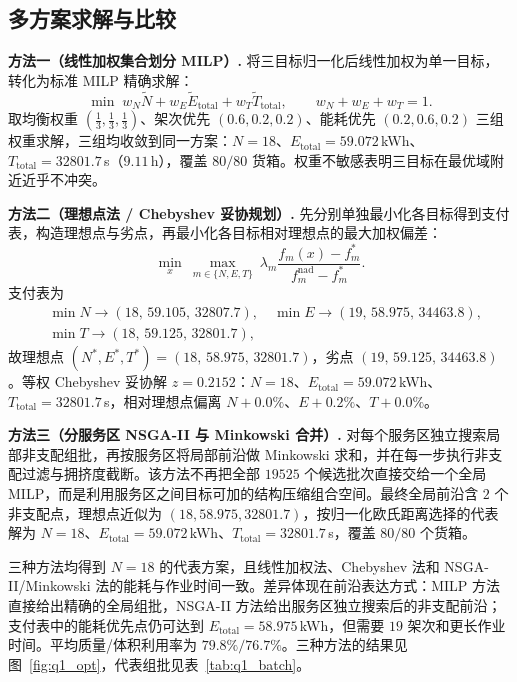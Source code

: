 \subsection{多方案求解与比较}

\textbf{方法一（线性加权集合划分 MILP）.} 将三目标归一化后线性加权为单一目标，转化为标准 MILP 精确求解：
\begin{equation}
\min\; w_N\tilde N+w_E\tilde E_{\text{total}}+w_T\tilde T_{\text{total}},\qquad w_N+w_E+w_T=1.
\end{equation}
取均衡权重 $(\tfrac13,\tfrac13,\tfrac13)$、架次优先 $(0.6,0.2,0.2)$、能耗优先 $(0.2,0.6,0.2)$ 三组权重求解，三组均收敛到同一方案：$N=18$、$E_{\text{total}}=59.072\,$kWh、$T_{\text{total}}=32801.7\,$s（$9.11\,$h），覆盖 $80/80$ 货箱。权重不敏感表明三目标在最优域附近近乎不冲突。

\textbf{方法二（理想点法 / Chebyshev 妥协规划）.} 先分别单独最小化各目标得到支付表，构造理想点与劣点，再最小化各目标相对理想点的最大加权偏差：
\begin{equation}
\min_{x}\ \max_{m\in\{N,E,T\}}\ \lambda_m\frac{f_m(x)-f_m^{*}}{f_m^{\text{nad}}-f_m^{*}} .
\end{equation}
支付表为
\begin{equation*}
\begin{aligned}
&\min N\to(18,\,59.105,\,32807.7),\quad
\min E\to(19,\,58.975,\,34463.8),\\
&\min T\to(18,\,59.125,\,32801.7),
\end{aligned}
\end{equation*}
故理想点 $(N^*,E^*,T^*)=(18,\,58.975,\,32801.7)$，劣点 $(19,\,59.125,\,34463.8)$。等权 Chebyshev 妥协解 $z=0.2152$：$N=18$、$E_{\text{total}}=59.072\,$kWh、$T_{\text{total}}=32801.7\,$s，相对理想点偏离 $N{+}0.0\%$、$E{+}0.2\%$、$T{+}0.0\%$。

\textbf{方法三（分服务区 NSGA-II 与 Minkowski 合并）.} 对每个服务区独立搜索局部非支配组批，再按服务区将局部前沿做 Minkowski 求和，并在每一步执行非支配过滤与拥挤度截断。该方法不再把全部 $19525$ 个候选批次直接交给一个全局 MILP，而是利用服务区之间目标可加的结构压缩组合空间。最终全局前沿含 $2$ 个非支配点，理想点近似为 $(18,58.975,32801.7)$，按归一化欧氏距离选择的代表解为 $N=18$、$E_{\text{total}}=59.072\,$kWh、$T_{\text{total}}=32801.7\,$s，覆盖 $80/80$ 个货箱。

三种方法均得到 $N=18$ 的代表方案，且线性加权法、Chebyshev 法和 NSGA-II/Minkowski 法的能耗与作业时间一致。差异体现在前沿表达方式：MILP 方法直接给出精确的全局组批，NSGA-II 方法给出服务区独立搜索后的非支配前沿；支付表中的能耗优先点仍可达到 $E_{\text{total}}=58.975\,$kWh，但需要 $19$ 架次和更长作业时间。平均质量/体积利用率为 $79.8\%/76.7\%$。三种方法的结果见图~\ref{fig:q1_opt}，代表组批见表~\ref{tab:q1_batch}。

